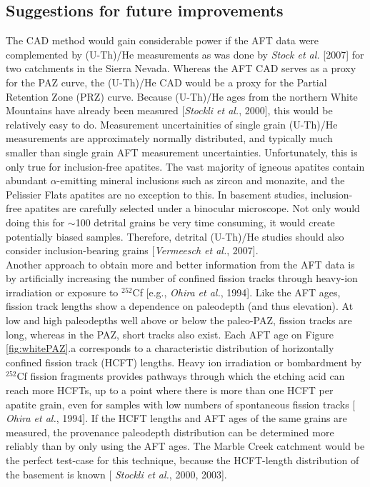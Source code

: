 \documentclass[12pt,twoside]{article}
\begin{document}
\subsection{Suggestions for future improvements}
\label{sec:future}

The  CAD method would  gain considerable  power if  the AFT  data were
complemented by  (U-Th)/He measurements as  was done by {\it  Stock et
  al.}  [2007] for  two catchments in the Sierra  Nevada.  Whereas the
AFT CAD serves  as a proxy for the PAZ curve,  the (U-Th)/He CAD would
be  a proxy  for  the  Partial Retention  Zone  (PRZ) curve.   Because
(U-Th)/He  ages from the  northern White  Mountains have  already been
measured [{\it Stockli  et al.}, 2000], this would  be relatively easy
to   do.   Measurement  uncertainities   of  single   grain  (U-Th)/He
measurements  are approximately  normally  distributed, and  typically
much  smaller  than  single   grain  AFT  measurement  uncertainties.  
Unfortunately,  this is  only true  for inclusion-free  apatites.  The
vast majority  of igneous apatites  contain abundant $\alpha$-emitting
mineral  inclusions such  as zircon  and monazite,  and  the Pelissier
Flats  apatites  are  no  exception  to this.   In  basement  studies,
inclusion-free  apatites  are  carefully  selected under  a  binocular
microscope.  Not  only would doing this for  $\sim$100 detrital grains
be very  time consuming, it  would create potentially biased  samples. 
Therefore,   detrital   (U-Th)/He   studies   should   also   consider
inclusion-bearing grains [{\it Vermeesch et al.}, 2007].
\\

Another approach  to obtain more  and better information from  the AFT
data  is by  artificially increasing  the number  of  confined fission
tracks through heavy-ion irradiation  or exposure to $^{252}$Cf [e.g.,
{\it Ohira et  al.}, 1994].  Like the AFT  ages, fission track lengths
show a dependence on paleodepth (and thus elevation).  At low and high
paleodepths  well above  or below  the paleo-PAZ,  fission  tracks are
long, whereas  in the PAZ, short  tracks also exist.  Each  AFT age on
Figure   \ref{fig:whitePAZ}.a    corresponds   to   a   characteristic
distribution of  horizontally confined  fission track (HCFT)  lengths. 
Heavy ion  irradiation or bombardment by  $^{252}$Cf fission fragments
provides pathways through which the etching acid can reach more HCFTs,
up to  a point where  there is more  than one HCFT per  apatite grain,
even for samples with low  numbers of spontaneous fission tracks [{\it
  Ohira et al.}, 1994].  If the  HCFT lengths and AFT ages of the same
grains  are measured,  the provenance  paleodepth distribution  can be
determined more reliably  than by only using the  AFT ages. The Marble
Creek  catchment would be  the perfect  test-case for  this technique,
because the  HCFT-length distribution of  the basement is  known [{\it
  Stockli et al.}, 2000, 2003].
\end{document}

